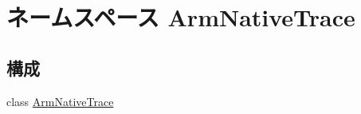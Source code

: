 \hypertarget{namespaceArmNativeTrace}{
\section{ネームスペース ArmNativeTrace}
\label{namespaceArmNativeTrace}
}
\subsection*{構成}
\begin{DoxyCompactItemize}
\item 
class \hyperlink{classArmNativeTrace_1_1ArmNativeTrace}{ArmNativeTrace}
\end{DoxyCompactItemize}
